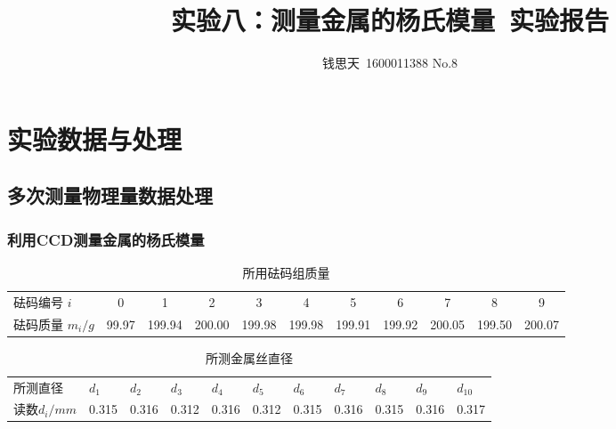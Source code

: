 \documentclass{ctexart}
\author{钱思天\ 1600011388 No.8}
\title{实验八：测量金属的杨氏模量\ 实验报告}
\begin{document}
      \maketitle
      \section{实验数据与处理}
      \subsection{多次测量物理量数据处理}
      \subsubsection{利用CCD测量金属的杨氏模量}
\begin{table}[H]
    \centering
    \caption{所用砝码组质量}
    \resizebox{\textwidth}{!}
    {
      \begin{tabular}{lcccccccccc}
      砝码编号 $i$ & 0     & 1     & 2     & 3     & 4     & 5     & 6     & 7     & 8     & 9 \\
      砝码质量 $m_i /g$ & 99.97 & 199.94 & 200.00 & 199.98 & 199.98 & 199.91 & 199.92 & 200.05 & 199.50 & 200.07 \\
      \end{tabular}%
    }
    \label{tab:addlabel}%
  \end{table}%
\begin{table}[H]
    \centering
    \caption{所测金属丝直径}
    \resizebox{\textwidth}{!}
    {
      \begin{tabular}{lrrrrrrrrrr}
      所测直径 & \multicolumn{1}{l}{$d_1$} & \multicolumn{1}{l}{$d_2$} & \multicolumn{1}{l}{$d_3$} & \multicolumn{1}{l}{$d_4$} & \multicolumn{1}{l}{$d_5$} & \multicolumn{1}{l}{$d_6$} & \multicolumn{1}{l}{$d_7$} & \multicolumn{1}{l}{$d_8$} & \multicolumn{1}{l}{$d_9$} & \multicolumn{1}{l}{$d_{10}$} \\
      读数$d_i/mm$    & 0.315 & 0.316 & 0.312 & 0.316 & 0.312 & 0.315 & 0.316 & 0.315 & 0.316 & 0.317 \\
      \end{tabular}%
    }
    \label{tab:addlabel}%
  \end{table}%
\end{document}
